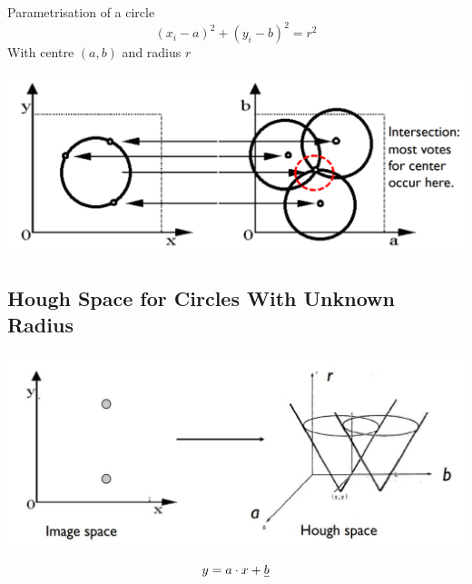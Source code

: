 \documentclass[11pt]{article}
\theoremstyle{definition}
\begin{document}
\begin{theorem}
	Parametrisation of a circle
	\begin{equation*}
		(x_i - a)^2 + (y_i - b)^2 = r^2
	\end{equation*}
	With centre $(a,b)$ and radius $r$
\end{theorem}

\begin{center}
	\includegraphics[width=0.7\linewidth]{img/hough_circle_accumulator}
\end{center}

\subsection{Hough Space for Circles With Unknown Radius}

\begin{center}
	\includegraphics[width=0.7\linewidth]{img/hough_circle_accumulator_point}
\end{center}

\begin{equation*}
	y = a\cdot x + \sout{b}
\end{equation*}
\end{document}
